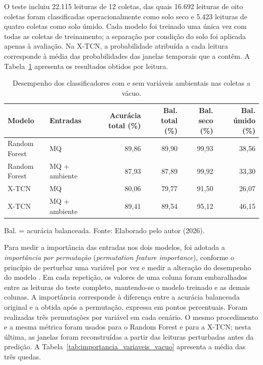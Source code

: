 O teste incluiu 22.115 leituras de 12 coletas, das quais 16.692 leituras de
oito coletas foram classificadas operacionalmente como solo seco e 5.423
leituras de quatro coletas como solo úmido. Cada modelo foi treinado uma única
vez com todas as coletas de treinamento; a separação por condição do solo foi
aplicada apenas à avaliação. Na X-TCN, a probabilidade atribuída a cada
leitura corresponde à média das probabilidades das janelas temporais que a
contêm. A Tabela~\ref{tab:ablacao_ambiente_vacuo} apresenta os resultados
obtidos por leitura.

\begin{table}[htbp]
    \centering
    \caption{Desempenho dos classificadores com e sem variáveis ambientais nas coletas a vácuo.}
    \label{tab:ablacao_ambiente_vacuo}
    \scriptsize
    \begin{tabular}{llrrrr}
        \hline
        \textbf{Modelo} & \textbf{Entradas} &
        \textbf{Acurácia total (\%)} &
        \textbf{Bal. total (\%)} &
        \textbf{Bal. seco (\%)} &
        \textbf{Bal. úmido (\%)} \\
        \hline
        Random Forest & MQ              & 89,86 & 89,90 & 99,93 & 38,56 \\
        Random Forest & MQ + ambiente   & 87,93 & 87,89 & 99,92 & 33,30 \\
        X-TCN         & MQ              & 80,06 & 79,77 & 91,50 & 26,07 \\
        X-TCN         & MQ + ambiente   & 89,41 & 89,54 & 95,12 & 46,15 \\
        \hline
    \end{tabular}

    \vspace{0.1cm}
    {\footnotesize Bal. = acurácia balanceada. Fonte: Elaborado pelo autor (2026).}
\end{table}

Para medir a importância das entradas nos dois modelos, foi adotada a
\emph{importância por permutação} (\emph{permutation feature importance}),
conforme o princípio de perturbar uma variável por vez e medir a alteração do
desempenho do modelo \cite{fisher2019modelreliance}. Em cada repetição, os
valores de uma coluna foram embaralhados entre as leituras do teste completo,
mantendo-se o modelo treinado e as demais colunas. A importância corresponde à
diferença entre a acurácia balanceada original e a obtida após a permutação,
expressa em pontos percentuais. Foram realizadas três permutações por variável
em cada cenário. O mesmo procedimento e a mesma métrica foram usados para o
Random Forest e para a X-TCN; nesta última, as janelas foram reconstruídas a
partir das leituras perturbadas antes da predição. A
Tabela~\ref{tab:importancia_variaveis_vacuo} apresenta a média das três quedas.

